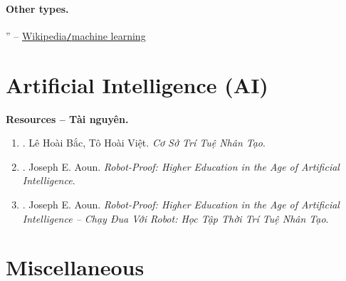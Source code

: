 \documentclass{article}
\begin{document}
\paragraph{Other types.}

'' -- \href{https://en.wikipedia.org/wiki/Machine_learning}{Wikipedia{\tt/}machine learning}


\section{Artificial Intelligence (AI)}
\textbf{\textsf{Resources -- Tài nguyên.}}
\begin{enumerate}
	\item \cite{Bac_Viet_AI}. {\sc Lê Hoài Bắc, Tô Hoài Việt}. {\it Cơ Sở Trí Tuệ Nhân Tạo}.
	\item \cite{Aoun_robot-proof}. {\sc Joseph E. Aoun}. {\it Robot-Proof: Higher Education in the Age of Artificial Intelligence}.
	\item \cite{Aoun_robot-proof_VN}. {\sc Joseph E. Aoun}. {\it Robot-Proof: Higher Education in the Age of Artificial Intelligence -- Chạy Đua Với Robot: Học Tập Thời Trí Tuệ Nhân Tạo}.
\end{enumerate}


\section{Miscellaneous}


\printbibliography[heading=bibintoc]
	
\end{document}
